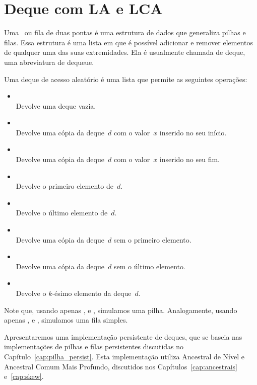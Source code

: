 \documentclass[main.tex]{subfiles}
\begin{document}
\chapter{Deque com LA e LCA} \label{cap:deque1_persist}

Uma~ ou fila de duas pontas é uma estrutura de dados que generaliza pilhas e filas. Essa estrutura é uma lista em que é possível adicionar e remover elementos de qualquer uma das suas extremidades. Ela é usualmente chamada de deque, uma abreviatura de dequeue.

Uma deque de acesso aleatório é uma lista que permite as seguintes operações:

\begin{itemize}
	\item {}
	      \\ Devolve uma deque vazia.
	\item {}
	      \\ Devolve uma cópia da deque~$d$ com o valor~$x$ inserido no seu início.
	\item {}
	      \\ Devolve uma cópia da deque~$d$ com o valor~$x$ inserido no seu fim.
	\item {}
	      \\ Devolve o primeiro elemento de~$d$.
	\item {}
	      \\ Devolve o último elemento de~$d$.
	\item {}
	      \\ Devolve uma cópia da deque~$d$ sem o primeiro elemento.
	\item {}
	      \\ Devolve uma cópia da deque~$d$ sem o último elemento.
	\item {}
	      \\ Devolve o $k$-ésimo elemento da deque~$d$.
\end{itemize}

Note que, usando apenas ,  e , simulamos uma pilha. Analogamente, usando apenas ,  e , simulamos uma fila simples.

Apresentaremos uma implementação persistente de deques, que se baseia nas implementações de pilhas e filas persistentes discutidas no Capítulo~\ref{cap:pilha_persist}. Esta implementação utiliza Ancestral de Nível e Ancestral Comum Mais Profundo, discutidos nos Capítulos~\ref{cap:ancestrais} e~\ref{cap:skew}.
\end{document}

